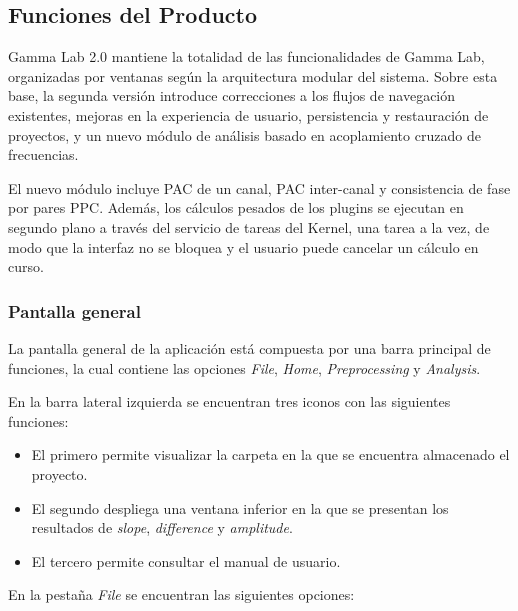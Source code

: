 \documentclass[12pt, letterpaper]{article}
\begin{document}
\subsection{Funciones del Producto}

Gamma Lab 2.0 mantiene la totalidad de las funcionalidades de Gamma Lab,
organizadas por ventanas según la arquitectura modular del sistema. Sobre
esta base, la segunda versión introduce correcciones a los flujos de
navegación existentes, mejoras en la experiencia de usuario, persistencia y
restauración de proyectos, y un nuevo módulo de análisis basado en
acoplamiento cruzado de frecuencias.

El nuevo módulo incluye PAC de un canal, PAC inter-canal y consistencia de fase por pares
PPC. Además, los cálculos pesados de los plugins se ejecutan en segundo plano
a través del servicio de tareas del Kernel, una tarea a la vez, de modo que la
interfaz no se bloquea y el usuario puede cancelar un cálculo en curso.

\subsubsection{Pantalla general}

La pantalla general de la aplicación está compuesta por una barra principal
de funciones, la cual contiene las opciones \textit{File}, \textit{Home},
\textit{Preprocessing} y \textit{Analysis}.

En la barra lateral izquierda se encuentran tres iconos con las siguientes
funciones:

\begin{itemize}

    \item El primero permite visualizar la carpeta en la que se encuentra
    almacenado el proyecto.

    \item El segundo despliega una ventana inferior en la que se presentan
    los resultados de \textit{slope}, \textit{difference} y \textit{amplitude}.

    \item El tercero permite consultar el manual de usuario.

\end{itemize}

En la pestaña \textit{File} se encuentran las siguientes opciones:
\end{document}
